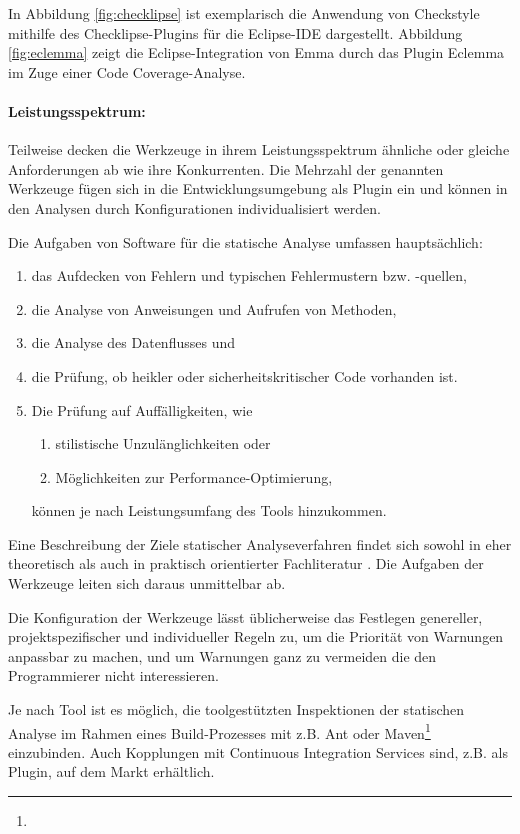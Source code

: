 In Abbildung \ref{fig:checklipse} ist exemplarisch die Anwendung von Checkstyle mithilfe des Checklipse-Plugins für die Eclipse-IDE dargestellt. Abbildung \ref{fig:eclemma} zeigt die Eclipse-Integration von Emma durch das Plugin Eclemma im Zuge einer Code Coverage-Analyse.


\paragraph{Leistungsspektrum:} Teilweise decken die Werkzeuge in ihrem Leistungsspektrum ähnliche oder gleiche Anforderungen ab wie ihre Konkurrenten. Die Mehrzahl der genannten Werkzeuge fügen sich in die Entwicklungsumgebung als Plugin ein und können in den Analysen durch Konfigurationen individualisiert werden. 

Die Aufgaben von Software für die statische Analyse umfassen hauptsächlich:
\begin{enumerate}
\item das Aufdecken von Fehlern und typischen Fehlermustern bzw. -quellen,
\item die Analyse von Anweisungen und Aufrufen von Methoden,
\item die Analyse des Datenflusses und
\item die Prüfung, ob heikler oder sicherheitskritischer Code vorhanden ist. 
\item Die Prüfung auf Auffälligkeiten, wie \begin{enumerate}
\item stilistische Unzulänglichkeiten oder
\item Möglichkeiten zur Performance-Optimierung,
\end{enumerate} können je nach Leistungsumfang des Tools hinzukommen.
\end{enumerate}

Eine Beschreibung der Ziele statischer Analyseverfahren findet sich sowohl in eher theoretisch \citep[S. 270]{liggesmeyer2009} als auch in praktisch orientierter Fachliteratur \citep[S. 98]{linz2010}. Die Aufgaben der Werkzeuge leiten sich daraus unmittelbar ab.

Die Konfiguration der Werkzeuge lässt üblicherweise das Festlegen genereller, projektspezifischer und individueller Regeln zu, um die Priorität von Warnungen anpassbar zu machen, und um Warnungen ganz zu vermeiden die den Programmierer nicht interessieren.

Je nach Tool ist es möglich, die toolgestützten Inspektionen der statischen Analyse im Rahmen eines Build-Prozesses mit z.B. Ant oder Maven\footnote{} einzubinden. Auch Kopplungen mit Continuous Integration Services sind, z.B. als Plugin, auf dem Markt erhältlich.

